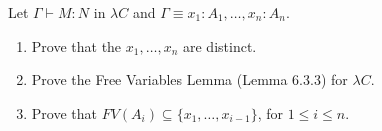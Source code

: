 \begin{problem}{6.11}
    Let $\Gamma \vdash M : N$ in $\lambda C$ and $\Gamma \equiv x_1 : A_1, \ldots, x_n : A_n$.
    \begin{enumerate}[label=$(\alph*)$]
    \item Prove that the $x_1, \ldots, x_n$ are distinct.
    \item Prove the Free Variables Lemma (Lemma 6.3.3) for $\lambda C$.
    \item Prove that $FV(A_i) \subseteq \{x_1, \ldots, x_{i-1}\}$, for $1 \leq i \leq n$.
    \end{enumerate}
\end{problem}